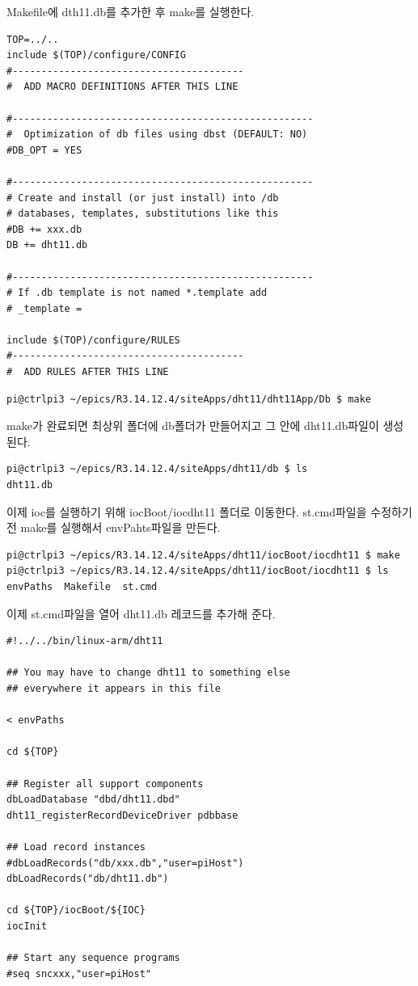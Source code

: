 \documentclass[11pt
  , a4paper
  , article
  , oneside
]{memoir}
\begin{document}
Makefile에 dth11.db를 추가한 후 make를 실행한다.
\begin{lstlisting}[style=termstyle]
TOP=../..
include $(TOP)/configure/CONFIG
#----------------------------------------
#  ADD MACRO DEFINITIONS AFTER THIS LINE

#----------------------------------------------------
#  Optimization of db files using dbst (DEFAULT: NO)
#DB_OPT = YES

#----------------------------------------------------
# Create and install (or just install) into /db
# databases, templates, substitutions like this
#DB += xxx.db
DB += dht11.db

#----------------------------------------------------
# If .db template is not named *.template add
# _template = 

include $(TOP)/configure/RULES
#----------------------------------------
#  ADD RULES AFTER THIS LINE
\end{lstlisting}
\begin{lstlisting}[style=termstyle]
pi@ctrlpi3 ~/epics/R3.14.12.4/siteApps/dht11/dht11App/Db $ make
\end{lstlisting}
make가 완료되면 최상위 폴더에 db폴더가 만들어지고 그 안에 dht11.db파일이 생성된다.
\begin{lstlisting}[style=termstyle]
pi@ctrlpi3 ~/epics/R3.14.12.4/siteApps/dht11/db $ ls
dht11.db
\end{lstlisting}
이제 ioc를 실행하기 위해 iocBoot/iocdht11 폴더로 이동한다.
st.cmd파일을 수정하기 전 make를 실행해서 envPahts파일을 만든다.
\begin{lstlisting}[style=termstyle]
pi@ctrlpi3 ~/epics/R3.14.12.4/siteApps/dht11/iocBoot/iocdht11 $ make
pi@ctrlpi3 ~/epics/R3.14.12.4/siteApps/dht11/iocBoot/iocdht11 $ ls
envPaths  Makefile  st.cmd
\end{lstlisting}
이제 st.cmd파일을 열어 dht11.db 레코드를 추가해 준다.
\begin{lstlisting}[style=termstyle]
#!../../bin/linux-arm/dht11

## You may have to change dht11 to something else
## everywhere it appears in this file

< envPaths

cd ${TOP}

## Register all support components
dbLoadDatabase "dbd/dht11.dbd"
dht11_registerRecordDeviceDriver pdbbase

## Load record instances
#dbLoadRecords("db/xxx.db","user=piHost")
dbLoadRecords("db/dht11.db")

cd ${TOP}/iocBoot/${IOC}
iocInit

## Start any sequence programs
#seq sncxxx,"user=piHost"
\end{lstlisting}
\end{document}
